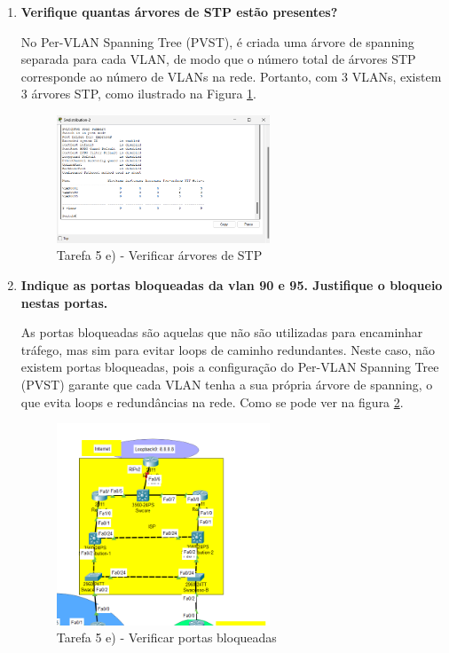 \documentclass[11pt,english, openright, oneside]{book}
\begin{document}
\begin{enumerate}[label=\Roman*.]
    \item \textbf{Verifique quantas árvores de STP estão presentes?}
    \vspace{0.2cm}

    No Per-VLAN Spanning Tree (PVST), é criada uma árvore de spanning separada
    para cada VLAN, de modo que o número total de árvores STP corresponde ao
    número de VLANs na rede. Portanto, com 3 VLANs, existem 3 árvores STP, como
    ilustrado na Figura \ref{fig:5.e.5}.

    \begin{figure}[H]
        \centering
        \includegraphics[width=0.6\textwidth]{imagens/Tarefa5/5.e.5.png}
        \caption{Tarefa 5 e) - Verificar árvores de STP}
        \label{fig:5.e.5}
    \end{figure}

    \vspace{0.8cm}
    
    \item \textbf{Indique as portas bloqueadas da vlan 90 e 95. Justifique o
    bloqueio nestas portas.}
    \vspace{0.2cm}

    As portas bloqueadas são aquelas que não são utilizadas para encaminhar
    tráfego, mas sim para evitar loops de caminho redundantes. Neste caso, não
    existem portas bloqueadas, pois a configuração do Per-VLAN Spanning Tree
    (PVST) garante que cada VLAN tenha a sua própria árvore de spanning, o que
    evita loops e redundâncias na rede. Como se pode ver na figura
    \ref{fig:5.e.6}.

    \begin{figure}[H]
        \centering
        \includegraphics[width=0.6\textwidth]{imagens/Tarefa5/5.e.6.png}
        \caption{Tarefa 5 e) - Verificar portas bloqueadas}
        \label{fig:5.e.6}
    \end{figure}

\end{enumerate}
\end{document}
